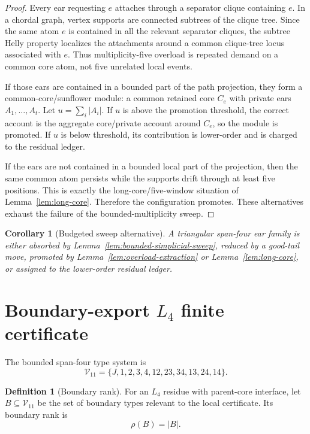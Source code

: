 \documentclass[11pt]{article}
\newtheorem{corollary}[theorem]{Corollary}
\theoremstyle{definition}
\newtheorem{definition}[theorem]{Definition}
\newcommand{\calV}{\mathcal V}
\begin{document}
\begin{proof}
Every ear requesting \(e\) attaches through a separator clique containing \(e\). In a chordal graph, vertex supports are connected subtrees of the clique tree. Since the same atom \(e\) is contained in all the relevant separator cliques, the subtree Helly property localizes the attachments around a common clique-tree locus associated with \(e\). Thus multiplicity-five overload is repeated demand on a common core atom, not five unrelated local events.

If those ears are contained in a bounded part of the path projection, they form a common-core/sunflower module: a common retained core \(C_e\) with private ears \(A_1,\ldots,A_t\). Let \(u=\sum_i |A_i|\). If \(u\) is above the promotion threshold, the correct account is the aggregate core/private account around \(C_e\), so the module is promoted. If \(u\) is below threshold, its contribution is lower-order and is charged to the residual ledger.

If the ears are not contained in a bounded local part of the projection, then the same common atom persists while the supports drift through at least five positions. This is exactly the long-core/five-window situation of Lemma~\ref{lem:long-core}. Therefore the configuration promotes. These alternatives exhaust the failure of the bounded-multiplicity sweep.
\end{proof}

\begin{corollary}[Budgeted sweep alternative]
\label{cor:budgeted-sweep-alternative}
A triangular span-four ear family is either absorbed by Lemma~\ref{lem:bounded-simplicial-sweep}, reduced by a good-tail move, promoted by Lemma~\ref{lem:overload-extraction} or Lemma~\ref{lem:long-core}, or assigned to the lower-order residual ledger.
\end{corollary}

\section{Boundary-export \(L_4\) finite certificate}

The bounded span-four type system is
\[
    \calV_{11}
    =
    \{J,1,2,3,4,12,23,34,13,24,14\}.
\]

\begin{definition}[Boundary rank]
For an \(L_4\) residue with parent-core interface, let \(B\subseteq\calV_{11}\) be the set of boundary types relevant to the local certificate. Its boundary rank is
\[
    \rho(B)=|B|.
\]
\end{definition}
\end{document}
